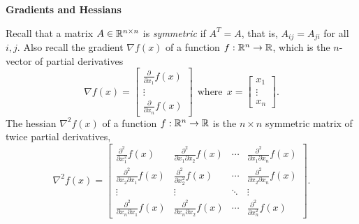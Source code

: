 
\item {} \textbf{Gradients and Hessians}

  Recall that a matrix $A \in \mathbb{R}^{n \times n}$ is \emph{symmetric} if
  $A^T = A$, that is, $A_{ij} = A_{ji}$ for all $i, j$. Also recall the
  gradient $\nabla f(x)$ of a function $f : \mathbb{R}^n \to \mathbb{R}$,
  which is the $n$-vector of partial derivatives
  \begin{equation*}
    \nabla f(x) = \left[\begin{matrix}
        \frac{\partial}{\partial x_1} f(x) \\ \vdots \\
        \frac{\partial}{\partial x_n} f(x) \end{matrix} \right]
    ~~ \mbox{where} ~~
    x = \left[\begin{matrix} x_1 \\ \vdots \\ x_n \end{matrix} \right].
  \end{equation*}
  The hessian $\nabla^2 f(x)$ of a function $f : \mathbb{R}^n \to \mathbb{R}$ is the
  $n \times n$ symmetric matrix of twice partial derivatives,
  \begin{equation*}
    \nabla^2 f(x) = \left[\begin{matrix}
        \frac{\partial^2}{\partial x_1^2} f(x)
        & \frac{\partial^2}{\partial x_1 \partial x_2} f(x)
        & \cdots & \frac{\partial^2}{\partial x_1 \partial x_n} f(x) \\
        \frac{\partial^2}{\partial x_2 \partial x_1} f(x)
        & \frac{\partial^2}{\partial x_2^2} f(x)
        & \cdots & \frac{\partial^2}{\partial x_2 \partial x_n} f(x) \\
        \vdots & \vdots & \ddots & \vdots \\
        \frac{\partial^2}{\partial x_n \partial x_1} f(x)
        & \frac{\partial^2}{\partial x_n \partial x_2} f(x)
        & \cdots
        & \frac{\partial^2}{\partial x_n^2} f(x)
      \end{matrix}
    \right].
  \end{equation*}

